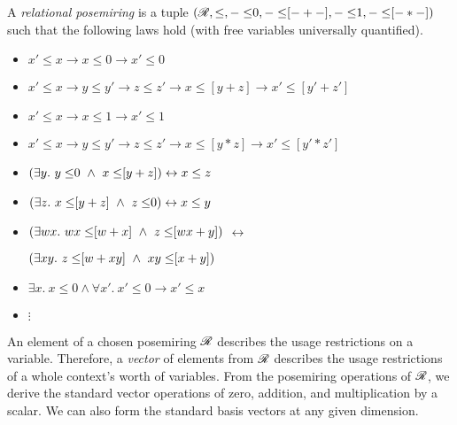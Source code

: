 \begin{definition}
  A \emph{relational posemiring} is a tuple
  $(\mathscr R, \leq, {{-}\leq}0, {{-}\leq}[{-}+{-}],
  {{-}\leq}1, {{-}\leq}[{-}*{-}])$
  such that the following laws hold (with free variables universally
  quantified).
  \begin{itemize}
    \item $x' \leq x \to {x \leq}0 \to {x' \leq}0$
    \item $x' \leq x \to y \leq y' \to z \leq z' \to
      {x \leq}[y+z] \to {x' \leq}[y'+z']$
    \item $x' \leq x \to {x \leq}1 \to {x' \leq}1$
    \item $x' \leq x \to y \leq y' \to z \leq z' \to
      {x \leq}[y*z] \to {x' \leq}[y'*z']$
    \item $\left({\exists y.~{y \leq}0 ~\wedge~ {x \leq}[y+z]}\right)
      \leftrightarrow x \leq z$
    \item $\left({\exists z.~{x \leq}[y+z] ~\wedge~ {z \leq}0}\right)
      \leftrightarrow x \leq y$
    \item $\left({\exists wx.~{wx \leq}[w+x] ~\wedge~ {z \leq}[wx+y]}\right)$
      $\leftrightarrow$

      $\left({\exists xy.~{z \leq}[w+xy] ~\wedge~ {xy \leq}[x+y]}\right)$
    \item $\exists x.~{x \leq}0 \land \forall x'.~{x' \leq}0 \to x' \leq x$
    \item $\vdots$
  \end{itemize}
\end{definition}

An element of a chosen posemiring $\mathscr R$ describes the usage restrictions on
a variable.
Therefore, a \emph{vector} of elements from $\mathscr R$ describes the usage
restrictions of a whole context's worth of variables.
From the posemiring operations of $\mathscr R$, we derive the standard vector
operations of zero, addition, and multiplication by a scalar.
We can also form the standard basis vectors at any given dimension.

